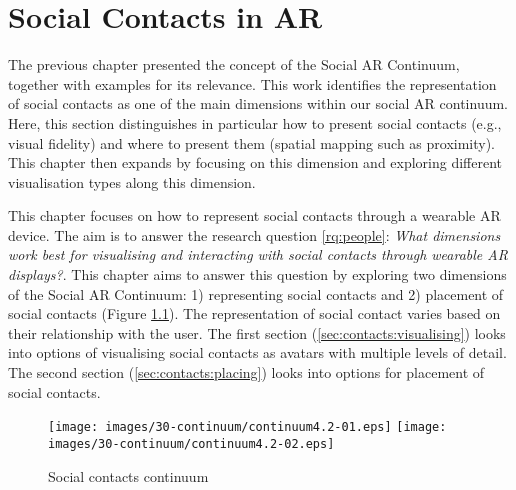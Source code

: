 \chapter{Social Contacts in AR}
\label{ch:contacts} 

The previous chapter presented the concept of the Social AR Continuum, together with examples for its relevance. This work identifies the representation of social contacts as one of the main dimensions within our social AR continuum. Here, this section distinguishes in particular how to present social contacts (e.g., visual fidelity) and where to present them (spatial mapping such as proximity). This chapter then expands by focusing on this dimension and exploring different visualisation types along this dimension. 

This chapter focuses on how to represent social contacts through a wearable AR device. The aim is to answer the research question \ref{rq:people}: \textit{What dimensions work best for visualising and interacting with social contacts through wearable AR displays?}. This chapter aims to answer this question by exploring two dimensions of the Social AR Continuum: 1) representing social contacts and 2) placement of social contacts (Figure \ref{fig:contacts:contacts-continuum}). The representation of social contact varies based on their relationship with the user. 
The first section (\ref{sec:contacts:visualising}) looks into options of visualising social contacts as avatars with multiple levels of detail. The second section (\ref{sec:contacts:placing}) looks into options for placement of social contacts. 

\begin{figure}[h]
  \centering
  \texttt{[image: images/30-continuum/continuum4.2-01.eps]}
  \texttt{[image: images/30-continuum/continuum4.2-02.eps]}
  \caption{Social contacts continuum}
  \label{fig:contacts:contacts-continuum}
\end{figure}





